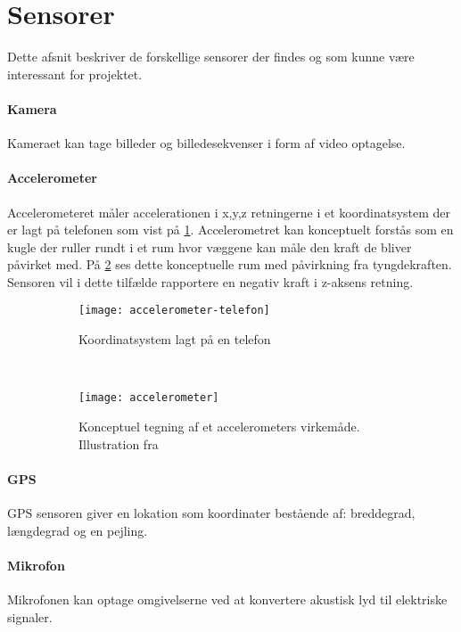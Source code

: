 \section{Sensorer}
Dette afsnit beskriver de forskellige sensorer der findes og som kunne være interessant for projektet. 

\paragraph{Kamera}
Kameraet kan tage billeder og billedesekvenser i form af video optagelse.

\paragraph{Accelerometer}
Accelerometeret måler accelerationen i x,y,z retningerne i et koordinatsystem der er lagt på telefonen som vist på \cref{analyse:accelerometer:koo}.
Accelerometret kan konceptuelt forstås som en kugle der ruller rundt i et rum hvor væggene kan måle den kraft de bliver påvirket med.
På \cref{analyse:accelerometer:kraft} ses dette konceptuelle rum med påvirkning fra tyngdekraften. 
Sensoren vil i dette tilfælde rapportere en negativ kraft i z-aksens retning.

\begin{figure}[h]
	\centering
	\begin{subfigure}[b]{0.47\textwidth}
		\centering
		\texttt{[image: accelerometer-telefon]}
		\caption{Koordinatsystem lagt på en telefon}
		\label{analyse:accelerometer:koo}
	\end{subfigure}
	~
	\begin{subfigure}[b]{0.47\textwidth}
		\centering
		\texttt{[image: accelerometer]}
		\caption{Konceptuel tegning af et accelerometers virkemåde. Illustration fra \cite{accelerometer}}
		\label{analyse:accelerometer:kraft}
	\end{subfigure}
	\caption{}
	\label{accelerometer}
\end{figure} 

\paragraph{GPS}
GPS sensoren giver en lokation som koordinater bestående af: breddegrad, længdegrad og en pejling.

\paragraph{Mikrofon}
Mikrofonen kan optage omgivelserne ved at konvertere akustisk lyd til elektriske signaler.

